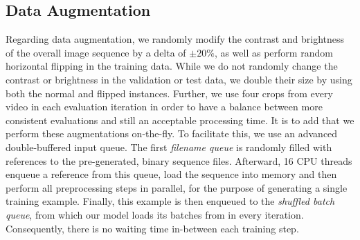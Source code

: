 \subsection{Data Augmentation}

Regarding data augmentation, we randomly modify the contrast and brightness of the overall image sequence by a delta of $ \pm20\% $, as well as perform random horizontal flipping in the training data. While we do not randomly change the contrast or brightness in the validation or test data, we double their size by using both the normal and flipped instances. Further, we use four crops from every video in each evaluation iteration in order to have a balance between more consistent evaluations and still an acceptable processing time. It is to add that we perform these augmentations on-the-fly. To facilitate this, we use an advanced double-buffered input queue. The first \textit{filename queue} is randomly filled with references to the pre-generated, binary sequence files. Afterward, \num{16} CPU threads enqueue a reference from this queue, load the sequence into memory and then perform all preprocessing steps in parallel, for the purpose of generating a single training example. Finally, this example is then enqueued to the \textit{shuffled batch queue}, from which our model loads its batches from in every iteration. Consequently, there is no waiting time in-between each training step.
